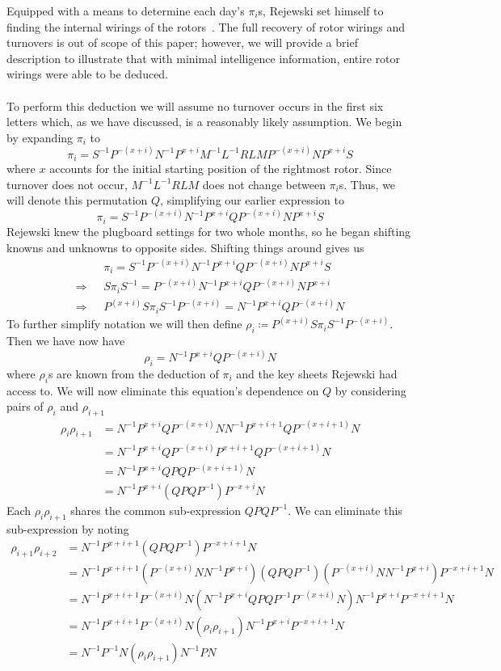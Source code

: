 Equipped with a means to determine each day's $\pi_i$s, Rejewski set
himself to finding the internal wirings of the rotors~\cite[pp.~219--221]{Rejewski1981}. The full
recovery of rotor wirings and turnovers is out of scope of this paper;
however, we will provide a brief description to illustrate that with
minimal intelligence information, entire rotor wirings were able to be deduced.
\\\\To perform this deduction we will assume no turnover occurs in
the first six letters which, as we have discussed, is a reasonably
likely assumption. We begin by expanding $\pi_i$ to
\[
  \pi_i = S^{-1}P^{-(x+i)}N^{-1}P^{x+i}M^{-1}L^{-1}RLMP^{-(x+i)}NP^{x+i}S
\]
where $x$ accounts for the initial starting position of the rightmost rotor.
Since turnover does not occur, $M^{-1}L^{-1}RLM$ does not change
between $\pi_i$s. Thus, we will
denote this permutation $Q$, simplifying our earlier expression to
\[
  \pi_i = S^{-1}P^{-(x+i)}N^{-1}P^{x+i}QP^{-(x+i)}NP^{x+i}S
\]
Rejewski knew the plugboard settings for two whole months, so he
began shifting knowns and unknowns to opposite sides. Shifting things
around gives us
\begin{align*}
  & \pi_i = S^{-1}P^{-(x+i)}N^{-1}P^{x+i}QP^{-(x+i)}NP^{x+i}S \\
  \Rightarrow\text{ } & S\pi_i S^{-1} =
  P^{-(x+i)}N^{-1}P^{x+i}QP^{-(x+i)}NP^{x+i}
  \\
  \Rightarrow\text{ } & P^{(x+i)}S\pi_i S^{-1}P^{-(x+i)} =
  N^{-1}P^{x+i}QP^{-(x+i)}N
\end{align*}
To further simplify notation we will then define ${\rho_i} \coloneq
P^{(x+i)}S\pi_i S^{-1}P^{-(x+i)}$. Then we have now have
\[
  \rho_i = N^{-1}P^{x+i}QP^{-(x+i)}N
\]
where $\rho_i$s are known from the deduction of $\pi_i$ and the
key sheets Rejewski had access to.
We will now eliminate this equation's dependence on $Q$ by considering
pairs of $\rho_i$ and $\rho_{i+1}$
\begin{align*}
  \rho_i\rho_{i+1} & = N^{-1}P^{x+i}QP^{-(x+i)}NN^{-1}P^{x+i+1}QP^{-(x+i+1)}N \\
  & = N^{-1}P^{x+i}QP^{-(x+i)}P^{x+i+1}QP^{-(x+i+1)}N        \\
  & = N^{-1}P^{x+i}QPQP^{-(x+i+1)}N                          \\
  & =N^{-1}P^{x+i}(QPQP^{-1})P^{-{x+i}}N
\end{align*}
Each $\rho_i\rho_{i+1}$ shares the common sub-expression $QPQP^{-1}$.
We can eliminate this sub-expression by noting
\begin{align*}
  \rho_{i+1}\rho_{i+2} & = N^{-1}P^{x+i+1}(QPQP^{-1})P^{-{x+i+1}}N
  \\
  & =
  N^{-1}P^{x+i+1}(P^{-(x+i)}NN^{-1}P^{x+i})(QPQP^{-1})(P^{-(x+i)}NN^{-1}P^{x+i})P^{-{x+i+1}}N
  \\
  & =
  N^{-1}P^{x+i+1}P^{-(x+i)}N(N^{-1}P^{x+i}QPQP^{-1}P^{-(x+i)}N)N^{-1}P^{x+i}P^{-{x+i+1}}N
  \\
  & =
  N^{-1}P^{x+i+1}P^{-(x+i)}N(\rho_i\rho_{i+1})N^{-1}P^{x+i}P^{-{x+i+1}}N
  \\
  & = N^{-1}P^{-1}N(\rho_i\rho_{i+1})N^{-1}PN
  \\
\end{align*}
